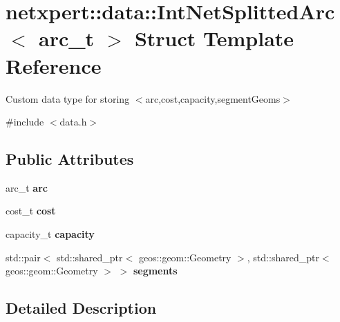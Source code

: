 \hypertarget{structnetxpert_1_1data_1_1IntNetSplittedArc}{}\section{netxpert\+:\+:data\+:\+:Int\+Net\+Splitted\+Arc$<$ arc\+\_\+t $>$ Struct Template Reference}
\label{structnetxpert_1_1data_1_1IntNetSplittedArc}


Custom data type for storing $<$arc,cost,capacity,segment\+Geoms$>$  




{\ttfamily \#include $<$data.\+h$>$}

\subsection*{Public Attributes}
\begin{DoxyCompactItemize}
\item 
arc\+\_\+t {\bfseries arc}\hypertarget{structnetxpert_1_1data_1_1IntNetSplittedArc_a84555d946cad0227dbb1b500c22417db}{}\label{structnetxpert_1_1data_1_1IntNetSplittedArc_a84555d946cad0227dbb1b500c22417db}

\item 
cost\+\_\+t {\bfseries cost}\hypertarget{structnetxpert_1_1data_1_1IntNetSplittedArc_a7e809fc3c3451bee691fd82990f336c1}{}\label{structnetxpert_1_1data_1_1IntNetSplittedArc_a7e809fc3c3451bee691fd82990f336c1}

\item 
capacity\+\_\+t {\bfseries capacity}\hypertarget{structnetxpert_1_1data_1_1IntNetSplittedArc_ac833c478d5765bc468046dccd70af07f}{}\label{structnetxpert_1_1data_1_1IntNetSplittedArc_ac833c478d5765bc468046dccd70af07f}

\item 
std\+::pair$<$ std\+::shared\+\_\+ptr$<$ geos\+::geom\+::\+Geometry $>$, std\+::shared\+\_\+ptr$<$ geos\+::geom\+::\+Geometry $>$ $>$ {\bfseries segments}\hypertarget{structnetxpert_1_1data_1_1IntNetSplittedArc_abf08996a9e91e5f6992886ec95299ac1}{}\label{structnetxpert_1_1data_1_1IntNetSplittedArc_abf08996a9e91e5f6992886ec95299ac1}

\end{DoxyCompactItemize}


\subsection{Detailed Description}
